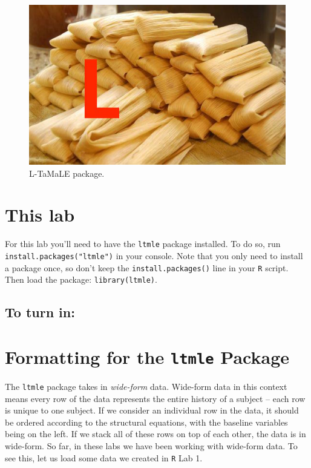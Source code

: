 \documentclass[answers]{exam}
\begin{document}
\begin{figure}
\begin{center}
\includegraphics[width=.4\textwidth]{../tamale.jpg}
\caption{L-TaMaLE package.}
\end{center}
\end{figure}


\section{This lab}

For this lab you'll need to have the \texttt{ltmle} package installed. To do so, run \texttt{install.packages("ltmle")} in your console. Note that you only need to install a package once, so don't keep the \texttt{install.packages()} line in your \texttt{R} script. Then load the package: \texttt{library(ltmle)}.

\subsection{To turn in:}


\noindent{}
\section{Formatting for the \texttt{ltmle} Package}

The \texttt{ltmle} package takes in \textit{wide-form} data. Wide-form data in this context means every row of the data represents the entire history of a subject -- each row is unique to one subject. If we consider an individual row in the data, it should be ordered according to the structural equations, with the baseline variables being on the left. If we stack all of these rows on top of each other, the data is in wide-form. So far, in these labs we have been working with wide-form data. To see this, let us load some data we created in \texttt{R} Lab 1.
\end{document}
